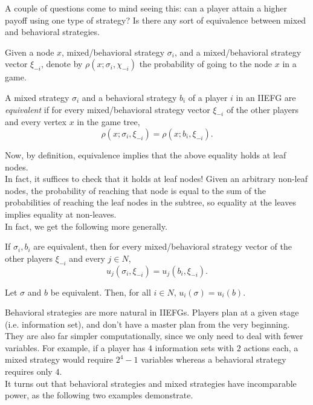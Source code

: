 	A couple of questions come to mind seeing this: can a player attain a higher payoff using one type of strategy? Is there any sort of equivalence between mixed and behavioral strategies.

	Given a node $x$, mixed/behavioral strategy $\sigma_i$, and a mixed/behavioral strategy vector $\xi_{-i}$, denote by $\rho(x;\sigma_i,\chi_{-i})$ the probability of going to the node $x$ in a game.
	\begin{fdef}
		A mixed strategy $\sigma_i$ and a behavioral strategy $b_i$ of a player $i$ in an IIEFG are \emph{equivalent} if for every mixed/behavioral strategy vector $\xi_{-i}$ of the other players and every vertex $x$ in the game tree,
		\[ \rho(x;\sigma_i,\xi_{-i}) = \rho(x;b_i,\xi_{-i}). \]
	\end{fdef}


	Now, by definition, equivalence implies that the above equality holds at leaf nodes.\\
	In fact, it suffices to check that it holds at leaf nodes! Given an arbitrary non-leaf nodes, the probability of reaching that node is equal to the sum of the probabilities of reaching the leaf nodes in the subtree, so equality at the leaves implies equality at non-leaves.\\
	In fact, we get the following more generally.

	\begin{ftheo}
		If $\sigma_i,b_i$ are equivalent, then for every mixed/behavioral strategy vector of the other players $\xi_{-i}$ and every $j \in N$,
		\[ u_j(\sigma_i,\xi_{-i}) = u_j(b_i,\xi_{-i}). \]
	\end{ftheo}
	\begin{fcor}
		Let $\sigma$ and $b$ be equivalent. Then, for all $i \in N$, $u_i(\sigma) = u_i(b)$.
	\end{fcor}

	Behavioral strategies are more natural in IIEFGs. Players plan at a given stage (i.e. information set), and don't have a master plan from the very beginning. They are also far simpler computationally, since we only need to deal with fewer variables. For example, if a player has $4$ information sets with $2$ actions each, a mixed strategy would require $2^4-1$ variables whereas a behavioral strategy requires only $4$.\\
	It turns out that behavioral strategies and mixed strategies have incomparable power, as the following two examples demonstrate. 

